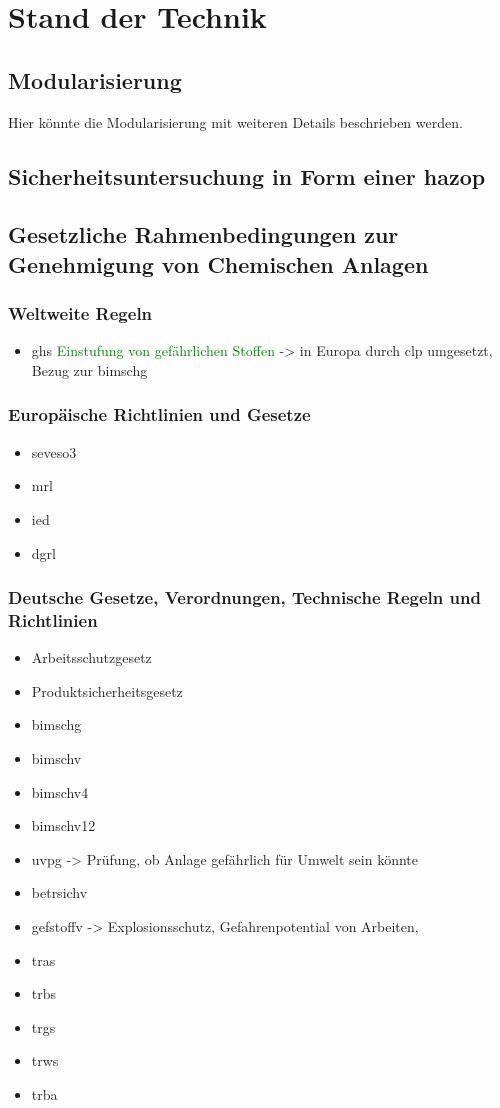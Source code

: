 \chapter{Stand der Technik} \label{ch:sdt}
\section{Modularisierung}
Hier k\"onnte die Modularisierung mit weiteren Details beschrieben werden. 
\section{Sicherheitsuntersuchung in Form einer \ac{hazop}}
\section{Gesetzliche Rahmenbedingungen zur Genehmigung von Chemischen Anlagen}
\subsection{Weltweite Regeln}
\begin{itemize}
\item \ac{ghs} \textcolor{green}{Einstufung von gef\"ahrlichen Stoffen} -> in Europa durch \ac{clp} umgesetzt, Bezug zur \ac{bimschg}
\end{itemize}
\subsection{Europ\"aische Richtlinien und Gesetze}
\begin{itemize}
\item \ac{seveso3}
\item \ac{mrl}
\item \ac{ied}
\item \ac{dgrl}
\end{itemize}
\subsection{Deutsche Gesetze, Verordnungen, Technische Regeln und Richtlinien}
\begin{itemize}
\item Arbeitsschutzgesetz
\item Produktsicherheitsgesetz
\item \ac{bimschg}
\item \ac{bimschv}
\item \ac{bimschv4}
\item \ac{bimschv12}
\item \ac{uvpg} -> Pr\"ufung, ob Anlage gef\"ahrlich f\"ur Umwelt sein k\"onnte
\item \ac{betrsichv}
\item \ac{gefstoffv} -> Explosionsschutz, Gefahrenpotential von Arbeiten, 
\item \ac{tras}
\item \ac{trbs}
\item \ac{trgs}
\item \ac{trws}
\item \ac{trba}
\end{itemize}
